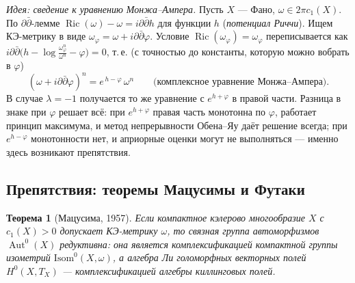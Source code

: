 \documentclass[11pt,a4paper]{article}
\theoremstyle{plain}
\newtheorem{theorem}{Теорема}[section]
\theoremstyle{definition}
\theoremstyle{remark}
\DeclareMathOperator{\Aut}{Aut}
\DeclareMathOperator{\Ric}{Ric}
\begin{document}
\emph{Идея: сведение к уравнению Монжа--Ампера.} Пусть $X$ --- Фано, $\omega\in2\pi c_1(X)$. По
$\partial\bar\partial$-лемме $\Ric(\omega)-\omega=i\partial\bar\partial h$ для функции $h$
(\emph{потенциал Риччи}). Ищем КЭ-метрику в виде $\omega_\varphi=\omega+i\partial\bar\partial\varphi$.
Условие $\Ric(\omega_\varphi)=\omega_\varphi$ переписывается как
$i\partial\bar\partial\big(h-\log\frac{\omega_\varphi^n}{\omega^n}-\varphi\big)=0$, т.\,е. (с точностью до
константы, которую можно вобрать в $\varphi$)
\[
(\omega+i\partial\bar\partial\varphi)^n=e^{\,h-\varphi}\,\omega^n
\qquad\text{(комплексное уравнение Монжа--Ампера).}
\]
В случае $\lambda=-1$ получается то же уравнение с $e^{h+\varphi}$ в правой части. Разница в
знаке при $\varphi$ решает всё: при $e^{h+\varphi}$ правая часть монотонна по $\varphi$, работает
принцип максимума, и метод непрерывности Обена--Яу даёт решение всегда; при $e^{h-\varphi}$
монотонности нет, и априорные оценки могут не выполняться --- именно здесь возникают препятствия.

\subsection{Препятствия: теоремы Мацусимы и Футаки}

\begin{theorem}[Мацусима, 1957]\label{thm:Matsushima}
Если компактное кэлерово многообразие $X$ с $c_1(X)>0$ допускает КЭ-метрику $\omega$, то связная
группа автоморфизмов $\Aut^0(X)$ редуктивна: она является комплексификацией компактной группы
изометрий $\mathrm{Isom}^0(X,\omega)$, а алгебра Ли голоморфных векторных полей $H^0(X,T_X)$ ---
комплексификацией алгебры киллинговых полей.
\end{theorem}
\end{document}

